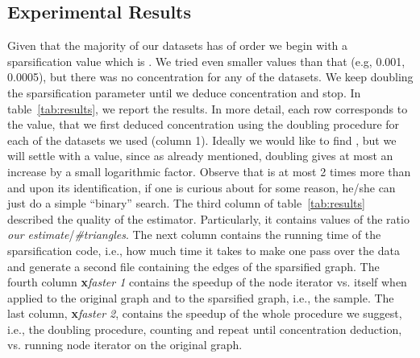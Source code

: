 \documentclass{llncs}
\begin{document}
\subsection{Experimental Results}

Given that the majority of our datasets has  of order  we begin with a sparsification value  which is .
We tried even smaller values than that (e.g, 0.001, 0.0005), but there was no concentration for any of the datasets.
We keep doubling the sparsification parameter until we deduce concentration and stop. In table~\ref{tab:results},
we report the results. In more detail, each row corresponds to the  value, that we first deduced concentration using the doubling
procedure for each of the datasets we used (column 1). 
Ideally we would like to find	, but we will settle with a  value, since as already mentioned, doubling gives
at most an increase by a small logarithmic factor. 
Observe that  is at most 2 times more than  and upon its identification,
if one is curious about    for some reason, he/she can just do a simple ``binary'' search.
The third column of table~\ref{tab:results} described the quality of the estimator. Particularly, 
it contains values of the ratio \textit{our estimate}/\textit{\#triangles}. 
The next column contains the running time of the sparsification code, i.e., how much time it takes
to make one pass over the data and generate a second file containing the edges of the sparsified graph.
The fourth column \textbf{x}\textit{faster 1} contains the speedup of the node iterator vs. itself
when applied to the original graph and to the sparsified graph, i.e., the sample. 
The last column, \textbf{x}\textit{faster 2}, contains the speedup of the whole procedure we suggest, i.e., the doubling procedure,
counting and  repeat until concentration deduction, vs. running node iterator on the original graph. 
\end{document}
